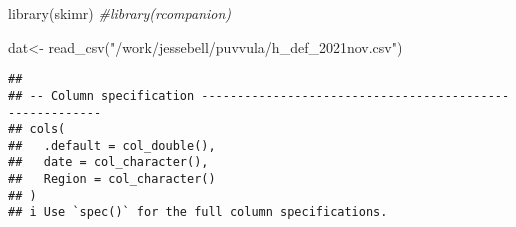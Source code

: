 \documentclass[
]{article}
\newenvironment{Shaded}{\begin{snugshade}}{\end{snugshade}}
\newcommand{\CommentTok}[1]{\textcolor[rgb]{0.56,0.35,0.01}{\textit{#1}}}
\newcommand{\FunctionTok}[1]{\textcolor[rgb]{0.00,0.00,0.00}{#1}}
\newcommand{\NormalTok}[1]{#1}
\newcommand{\OtherTok}[1]{\textcolor[rgb]{0.56,0.35,0.01}{#1}}
\newcommand{\StringTok}[1]{\textcolor[rgb]{0.31,0.60,0.02}{#1}}
\begin{document}
\begin{Shaded}
\begin{Highlighting}[]
\FunctionTok{library}\NormalTok{(skimr)}
\CommentTok{\#library(rcompanion)}

\NormalTok{dat}\OtherTok{\textless{}{-}} \FunctionTok{read\_csv}\NormalTok{(}\StringTok{"/work/jessebell/puvvula/h\_def\_2021nov.csv"}\NormalTok{)}
\end{Highlighting}
\end{Shaded}

\begin{verbatim}
## 
## -- Column specification --------------------------------------------------------
## cols(
##   .default = col_double(),
##   date = col_character(),
##   Region = col_character()
## )
## i Use `spec()` for the full column specifications.
\end{verbatim}
\end{document}
